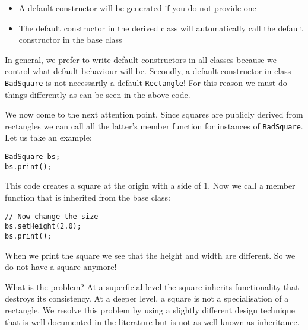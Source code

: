 \begin{itemize}
	\item A default constructor will be generated if you do not provide one
	\item The default constructor in the derived class will automatically call the default constructor in the base class
\end{itemize}
In general, we prefer to write default constructors in all classes because we control what default behaviour will be. Secondly, a default constructor in class \texttt{BadSquare} is not necessarily a default \texttt{Rectangle}! For this reason we must do things differently as can be seen in the above code.

We now come to the next attention point. Since squares are publicly derived from rectangles we can call all the latter's member function for instances of \texttt{BadSquare}. Let us take an example:
\begin{lstlisting}
BadSquare bs;
bs.print();
\end{lstlisting}
This code creates a square at the origin with a side of $1$. Now we call a member function that is inherited from the base class:
\begin{lstlisting}
// Now change the size
bs.setHeight(2.0);
bs.print();
\end{lstlisting}
When we print the square we see that the height and width are different. So we do not have a square anymore!

What is the problem? At a superficial level the square inherits functionality that destroys its consistency. At a deeper level, a square is not a specialisation of a rectangle. We resolve this problem by using a slightly different design technique that is well documented in the literature but is not as well known as inheritance.

